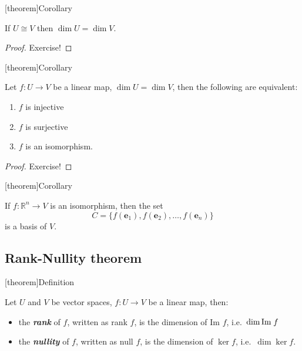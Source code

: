 \documentclass[12pt]{report}
\theoremstyle{definition}
\begin{document}
[theorem]{Corollary}
\begin{isomorphic vector spaces have the same dimension}
    If $U \cong V$ then $\dim{U} = \dim{V}$.
\end{isomorphic vector spaces have the same dimension}

\begin{proof}
    Exercise!
\end{proof}

[theorem]{Corollary}
\begin{linear map over two V of same dim}
    Let $f:U\rightarrow{}V$ be a linear map, $\dim{U} = \dim{V}$, then the following are equivalent:
    \begin{enumerate}[label = (\roman*)]
        \item $f$ is injective
        \item $f$ is surjective
        \item $f$ is an isomorphism.
    \end{enumerate}
\end{linear map over two V of same dim}

\begin{proof}
    Exercise!
\end{proof}

[theorem]{Corollary}
\begin{find basis in new vector space}
    If $f:\mathbb{R}^{n}\rightarrow{}V$ is an isomorphism, then the set\[
        C = \{f(\mathbf{e}_1), f(\mathbf{e}_2),\ldots, f(\mathbf{e}_n)\}
    \]is a basis of $V$.
\end{find basis in new vector space}

\subsection{Rank-Nullity theorem}

[theorem]{Definition}
\begin{def of rank and nullity}
    Let $U$ and $V$ be vector spaces, $f:U\rightarrow{}V$ be a linear map, then:
    \begin{itemize}
        \item the \textbf{\emph{rank}} of $f$, written as rank $f$,
            is the dimension of Im $f$, i.e.\ $\dim{\textnormal{Im}\; f}$
        \item the \textbf{\emph{nullity}} of $f$, written as null $f$,
            is the dimension of $\ker{f}$, i.e.\ $\dim{\ker{f}}$.
    \end{itemize}
\end{def of rank and nullity}
\end{document}
